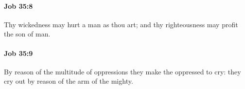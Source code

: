 		\paragraph{Job 35:8} %
			\label{JOB-35-8}

			Thy wickedness may hurt a man as thou art; and thy righteousness may profit the son of man.


		\paragraph{Job 35:9} %
			\label{JOB-35-9}

			By reason of the multitude of oppressions they make the oppressed to cry: they cry out by reason of the arm of the mighty.


